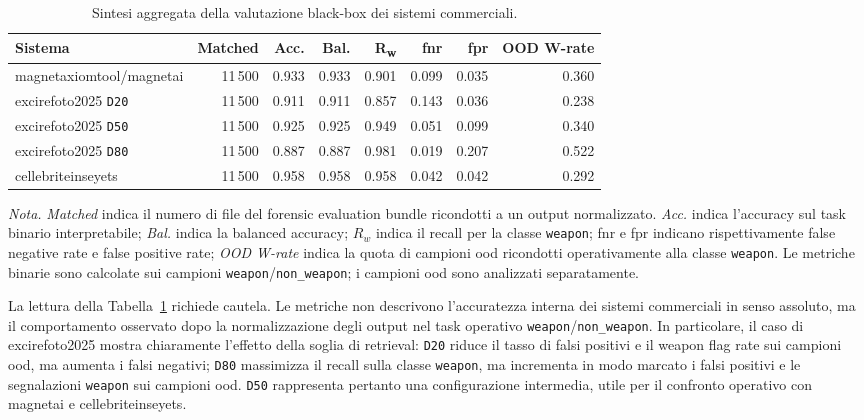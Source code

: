 \begin{table}[H]
\centering
\scriptsize
\renewcommand{\arraystretch}{1.15}
\setlength{\tabcolsep}{3.4pt}
\caption{Sintesi aggregata della valutazione black-box dei sistemi commerciali.}
\label{tab:results-commercial-overview}
\begin{tabular}{@{}l r r r r r r r@{}}
\toprule
\textbf{Sistema} &
\textbf{Matched} &
\textbf{Acc.} &
\textbf{Bal.} &
\textbf{R\textsubscript{w}} &
\textbf{\acrshort{fnr}} &
\textbf{\acrshort{fpr}} &
\textbf{OOD W-rate} \\
\midrule
\gls{magnetaxiomtool}/\gls{magnetai}
& 11\,500 & 0.933 & 0.933 & 0.901 & 0.099 & 0.035 & 0.360 \\

\gls{excirefoto2025} \texttt{D20}
& 11\,500 & 0.911 & 0.911 & 0.857 & 0.143 & 0.036 & 0.238 \\

\gls{excirefoto2025} \texttt{D50}
& 11\,500 & 0.925 & 0.925 & 0.949 & 0.051 & 0.099 & 0.340 \\

\gls{excirefoto2025} \texttt{D80}
& 11\,500 & 0.887 & 0.887 & 0.981 & 0.019 & 0.207 & 0.522 \\

\gls{cellebriteinseyets}
& 11\,500 & 0.958 & 0.958 & 0.958 & 0.042 & 0.042 & 0.292 \\
\bottomrule
\end{tabular}

\vspace{0.4em}
\footnotesize
\textit{Nota.} \textit{Matched} indica il numero di file del forensic evaluation
bundle ricondotti a un output normalizzato. \textit{Acc.} indica l'accuracy sul
task binario interpretabile; \textit{Bal.} indica la balanced accuracy;
\(R_w\) indica il recall per la classe \texttt{weapon}; \gls{fnr} e \gls{fpr}
indicano rispettivamente false negative rate e false positive rate; \textit{OOD
W-rate} indica la quota di campioni \gls{ood} ricondotti operativamente alla
classe \texttt{weapon}. Le metriche binarie sono calcolate sui campioni
\texttt{weapon}/\texttt{non\_weapon}; i campioni \gls{ood} sono analizzati
separatamente.
\end{table}

La lettura della Tabella~\ref{tab:results-commercial-overview} richiede cautela.
Le metriche non descrivono l'accuratezza interna dei sistemi commerciali in senso
assoluto, ma il comportamento osservato dopo la normalizzazione degli output nel
task operativo \texttt{weapon}/\texttt{non\_weapon}. In particolare, il caso di
\gls{excirefoto2025} mostra chiaramente l'effetto della soglia di retrieval:
\texttt{D20} riduce il tasso di falsi positivi e il weapon flag rate sui campioni
\gls{ood}, ma aumenta i falsi negativi; \texttt{D80} massimizza il recall sulla
classe \texttt{weapon}, ma incrementa in modo marcato i falsi positivi e le
segnalazioni \texttt{weapon} sui campioni \gls{ood}. \texttt{D50} rappresenta
pertanto una configurazione intermedia, utile per il confronto operativo con
\gls{magnetai} e \gls{cellebriteinseyets}.

